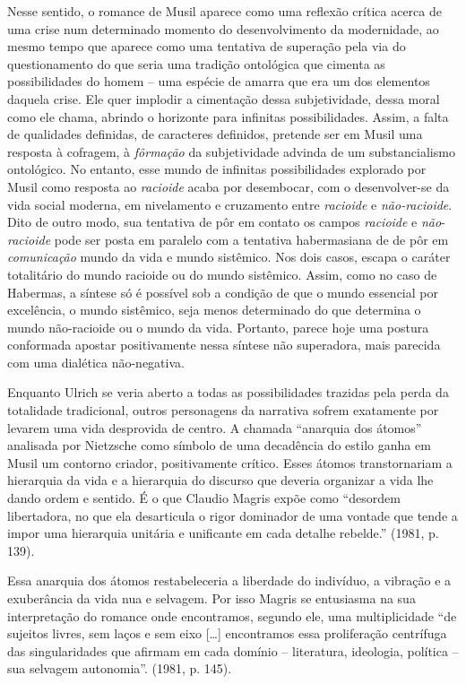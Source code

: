 Nesse sentido, o romance de Musil aparece como uma reflexão crítica
acerca de uma crise num determinado momento do desenvolvimento da
modernidade, ao mesmo tempo que aparece como uma tentativa de superação
pela via do questionamento do que seria uma tradição ontológica que
cimenta as possibilidades do homem -- uma espécie de amarra que era um
dos elementos daquela crise. Ele quer implodir a cimentação dessa
subjetividade, dessa moral como ele chama, abrindo o horizonte para
infinitas possibilidades. Assim, a falta de qualidades definidas, de
caracteres definidos, pretende ser em Musil uma resposta à cofragem, à
\emph{fôrmação} da subjetividade advinda de um substancialismo
ontológico. No entanto, esse mundo de infinitas possibilidades explorado
por Musil como resposta ao \emph{racioide} acaba por desembocar, com o
desenvolver-se da vida social moderna, em nivelamento e cruzamento entre
\emph{racioide} e \emph{não-racioide}. Dito de outro modo, sua tentativa
de pôr em contato os campos \emph{racioide} e \emph{não}-\emph{racioide}
pode ser posta em paralelo com a tentativa habermasiana de de pôr em
\emph{comunicação} mundo da vida e mundo sistêmico. Nos dois casos,
escapa o caráter totalitário do mundo racioide ou do mundo sistêmico.
Assim, como no caso de Habermas, a síntese só é possível sob a condição
de que o mundo essencial por excelência, o mundo sistêmico, seja menos
determinado do que determina o mundo não-racioide ou o mundo da vida.
Portanto, parece hoje uma postura conformada apostar positivamente nessa
síntese não superadora, mais parecida com uma dialética não-negativa.

Enquanto Ulrich se veria aberto a todas as possibilidades trazidas pela
perda da totalidade tradicional, outros personagens da narrativa sofrem
exatamente por levarem uma vida desprovida de centro. A chamada
``anarquia dos átomos'' analisada por Nietzsche como símbolo de uma
decadência do estilo ganha em Musil um contorno criador, positivamente
crítico. Esses átomos transtornariam a hierarquia da vida e a hierarquia
do discurso que deveria organizar a vida lhe dando ordem e sentido. É o
que Claudio Magris expõe como ``desordem libertadora, no que ela
desarticula o rigor dominador de uma vontade que tende a impor uma
hierarquia unitária e unificante em cada detalhe rebelde.'' (1981, p.
139).

Essa anarquia dos átomos restabeleceria a liberdade do indivíduo, a
vibração e a exuberância da vida nua e selvagem. Por isso Magris se
entusiasma na sua interpretação do romance onde encontramos, segundo
ele, uma multiplicidade ``de sujeitos livres, sem laços e sem eixo
{[}\ldots{}{]} encontramos essa proliferação centrífuga das
singularidades que afirmam em cada domínio -- literatura, ideologia,
política -- sua selvagem autonomia''. (1981, p. 145).

